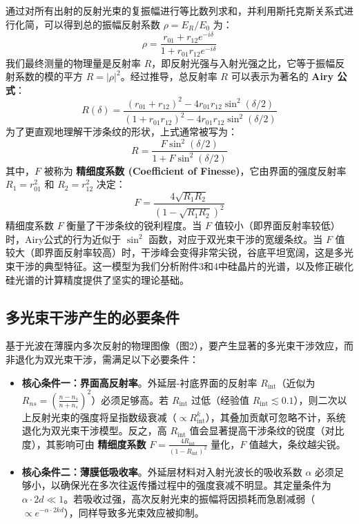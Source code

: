 \documentclass[withoutpreface,bwprint]{cumcmthesis} %
\begin{document}
通过对所有出射的反射光束的复振幅进行等比数列求和，并利用斯托克斯关系式进行化简，可以得到总的振幅反射系数 $\rho = E_R / E_0$ 为：
$$
    \rho = \frac{r_{01} + r_{12} e^{-i\delta}}{1 + r_{01} r_{12} e^{-i\delta}}
$$
我们最终测量的物理量是反射率 $R$，即反射光强与入射光强之比，它等于振幅反射系数的模的平方 $R = |\rho|^2$。经过推导，总反射率 $R$ 可以表示为著名的 \textbf{Airy 公式}：
$$
    R(\delta) = \frac{(r_{01} + r_{12})^2 - 4r_{01}r_{12}\sin^2(\delta/2)}{(1 + r_{01}r_{12})^2 - 4r_{01}r_{12}\sin^2(\delta/2)}
$$
为了更直观地理解干涉条纹的形状，上式通常被写为：
$$
    R = \frac{F \sin^2(\delta/2)}{1 + F \sin^2(\delta/2)}
$$
其中，$F$ 被称为 \textbf{精细度系数 (Coefficient of Finesse)}，它由界面的强度反射率 $R_1 = r_{01}^2$ 和 $R_2 = r_{12}^2$ 决定：
$$
    F = \frac{4\sqrt{R_1 R_2}}{(1-\sqrt{R_1 R_2})^2}
$$
精细度系数 $F$ 衡量了干涉条纹的锐利程度。当 $F$ 值较小（即界面反射率较低）时，Airy公式的行为近似于 $\sin^2$ 函数，对应于双光束干涉的宽缓条纹。当 $F$ 值较大（即界面反射率较高）时，干涉峰会变得非常尖锐，谷底平坦宽阔，这是多光束干涉的典型特征。这一模型为我们分析附件3和4中硅晶片的光谱，以及修正碳化硅光谱的计算精度提供了坚实的理论基础。

\subsection{多光束干涉产生的必要条件}
基于光波在薄膜内多次反射的物理图像（图2），要产生显著的多光束干涉效应，而非退化为双光束干涉，需满足以下必要条件：

\begin{itemize}
    \item \textbf{核心条件一：界面高反射率}。外延层-衬底界面的反射率 $R_{\text{int}}$（近似为 $R_{ns} = \left( \frac{n - n_s}{n + n_s} \right)^2$）必须足够高。若 $R_{\text{int}}$ 过低（经验值 $R_{\text{int}} \lesssim 0.1$），则二次以上反射光束的强度将呈指数级衰减（$\propto R_{\text{int}}^k$），其叠加贡献可忽略不计，系统退化为双光束干涉模型。反之，高 $R_{\text{int}}$ 值会显著提高干涉条纹的锐度（对比度），其影响可由 \textbf{精细度系数} $F = \frac{4R_{\text{int}}}{(1-R_{\text{int}})^2}$ 量化，$F$ 值越大，条纹越尖锐。

    \item \textbf{核心条件二：薄膜低吸收率}。外延层材料对入射光波长的吸收系数 $\alpha$ 必须足够小，以确保光在多次往返传播过程中的强度衰减不明显。其定量条件为 $\alpha \cdot 2d \ll 1$。若吸收过强，高次反射光束的振幅将因损耗而急剧减弱（$\propto e^{-\alpha \cdot 2k d}$），同样导致多光束效应被抑制。
\end{itemize}
\end{document}
